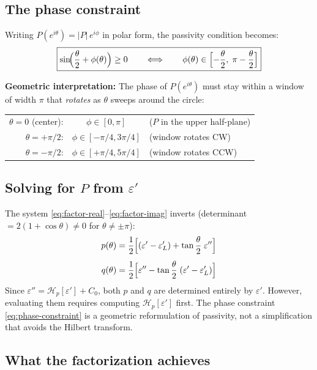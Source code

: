 \documentclass[11pt]{article}
\newcommand{\eps}{\varepsilon}
\newcommand{\Hp}{\mathcal{H}_p}
\begin{document}
\subsection{The phase constraint}

Writing $P(e^{i\theta}) = |P|\,e^{i\phi}$ in polar form, the passivity condition becomes:
\begin{equation}\label{eq:phase-constraint}
\boxed{\sin\!\Bigl(\frac{\theta}{2} + \phi(\theta)\Bigr) \geq 0 \qquad\Longleftrightarrow\qquad \phi(\theta) \in \Bigl[-\frac{\theta}{2},\;\pi - \frac{\theta}{2}\Bigr]}
\end{equation}

\textbf{Geometric interpretation:} The phase of $P(e^{i\theta})$ must stay within a window of width $\pi$ that \emph{rotates} as $\theta$ sweeps around the circle:
\begin{center}
\begin{tabular}{rcl}
$\theta = 0$ (center): & $\phi \in [0, \pi]$ & ($P$ in the upper half-plane) \\
$\theta = +\pi/2$: & $\phi \in [-\pi/4, 3\pi/4]$ & (window rotates CW) \\
$\theta = -\pi/2$: & $\phi \in [+\pi/4, 5\pi/4]$ & (window rotates CCW) \\
\end{tabular}
\end{center}

\subsection{Solving for $P$ from $\eps'$}

The system \eqref{eq:factor-real}--\eqref{eq:factor-imag} inverts (determinant $= 2(1+\cos\theta) \neq 0$ for $\theta \neq \pm\pi$):
\begin{align}
p(\theta) &= \frac{1}{2}\Bigl[(\eps' - \eps'_L) + \tan\frac{\theta}{2}\;\eps''\Bigr] \\[4pt]
q(\theta) &= \frac{1}{2}\Bigl[\eps'' - \tan\frac{\theta}{2}\;(\eps' - \eps'_L)\Bigr]
\end{align}
Since $\eps'' = \Hp[\eps'] + C_0$, both $p$ and $q$ are determined entirely by $\eps'$.  However, evaluating them requires computing $\Hp[\eps']$ first.  The phase constraint \eqref{eq:phase-constraint} is a geometric reformulation of passivity, not a simplification that avoids the Hilbert transform.

\subsection{What the factorization achieves}
\end{document}
